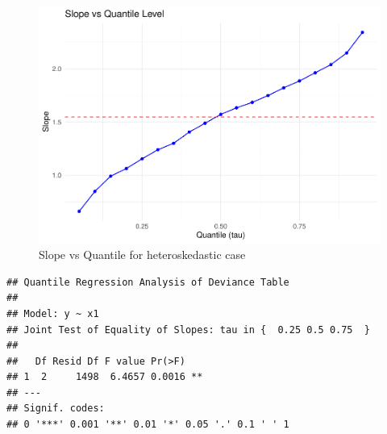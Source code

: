 \documentclass[fleqn,8pt]{latex/stylish_article} %
\newenvironment{Shaded}{\begin{snugshade}}{\end{snugshade}}
\newcommand{\FloatTok}[1]{\textcolor[rgb]{0.00,0.00,0.81}{{#1}}}
\newcommand{\SpecialCharTok}[1]{\textcolor[rgb]{0.00,0.00,0.00}{{#1}}}
\newcommand{\OtherTok}[1]{\textcolor[rgb]{0.56,0.35,0.01}{{#1}}}
\newcommand{\FunctionTok}[1]{\textcolor[rgb]{0.00,0.00,0.00}{{#1}}}
\newcommand{\AttributeTok}[1]{\textcolor[rgb]{0.77,0.63,0.00}{{#1}}}
\newcommand{\NormalTok}[1]{{#1}}
\begin{document}
\begin{figure}

{\centering \includegraphics[width=0.8\linewidth]{ADR_project_files/figure-latex/plot-coef-vs-quantile-1} 

}

\caption{Slope vs Quantile for heteroskedastic case}\label{fig:plot-coef-vs-quantile}
\end{figure}

\begin{Shaded}
\end{Shaded}

\begin{verbatim}
## Quantile Regression Analysis of Deviance Table
## 
## Model: y ~ x1
## Joint Test of Equality of Slopes: tau in {  0.25 0.5 0.75  }
## 
##   Df Resid Df F value Pr(>F)   
## 1  2     1498  6.4657 0.0016 **
## ---
## Signif. codes:  
## 0 '***' 0.001 '**' 0.01 '*' 0.05 '.' 0.1 ' ' 1
\end{verbatim}
\end{document}
